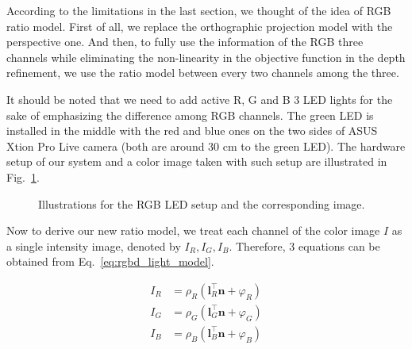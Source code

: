According to the limitations in the last section, we thought of the idea of RGB ratio model.
First of all, we replace the orthographic projection model with the perspective one.
And then, to fully use the information of the RGB three channels while eliminating the non-linearity in the objective function in the depth refinement, we use the ratio model between every two channels among the three.

It should be noted that we need to add active R, G and B 3 LED lights for the sake of emphasizing the difference among RGB channels.
The green LED is installed in the middle with the red and blue ones on the two sides of ASUS Xtion Pro Live camera (both are around 30 cm to the green LED).
The hardware setup of our system and a color image taken with such setup are illustrated in Fig.~\ref{fig:ratio_setup}.

\begin{figure}[!htbp]
\centering
{}
\caption{Illustrations for the RGB LED setup and the corresponding image.}
\label{fig:ratio_setup}
\end{figure}


Now to derive our new ratio model, we treat each channel of the color image $I$ as a single intensity image, denoted by $I_R, I_G, I_B$.
Therefore, 3 equations can be obtained from Eq.~\ref{eq:rgbd_light_model}.

\begin{equation}\label{eq:ratio_prepare}
    \begin{split}
    I_R &= \rho_R(\mathbf{l}_R^\top \mathbf{n} + \varphi_R)\\
    I_G &= \rho_G(\mathbf{l}_G^\top \mathbf{n} + \varphi_G)\\
    I_B &= \rho_B(\mathbf{l}_B^\top \mathbf{n} + \varphi_B)
    \end{split}
\end{equation}

